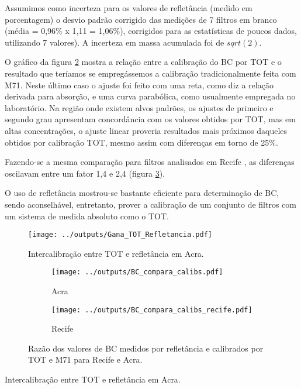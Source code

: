 Assumimos como incerteza para os valores de refletância (medido em porcentagem)
o desvio padrão corrigido das medições de 7 filtros em branco 
(média = 0,96\% x 1,11 = 1,06\%), corrigidos para as estatísticas de poucos 
dados, utilizando 7 valores). A incerteza em massa acumulada foi de $sqrt(2)$.

O gráfico da figura \ref{fig:razaoTOTM71} mostra a relação entre a calibração do 
BC por TOT e o resultado que teríamos se empregássemos a calibração 
tradicionalmente feita com M71. Neste último caso o ajuste foi feito com uma
reta, como diz a relação derivada para absorção, e uma curva parabólica, 
como usualmente empregada no laboratório. Na região onde existem alvos padrões, 
os ajustes de primeiro e segundo grau apresentam concordância com os valores 
obtidos por TOT, mas em altas concentrações, o ajuste linear proveria resultados
mais próximos daqueles obtidos por calibração TOT, mesmo assim com diferenças 
em torno de 25\%. 

Fazendo-se a mesma comparação para filtros analisados em Recife \citep{santos2014},
as diferenças oscilavam entre um fator 1,4 e 2,4 (figura \ref{fig:BC_compara_recife}).

O uso de refletância mostrou-se bastante eficiente para determinação de BC, 
sendo aconselhável, entretanto, prover a calibração de um conjunto de filtros 
com um sistema de medida absoluto como o TOT.


\begin{figure}[H]
	\begin{center}
		\texttt{[image: ../outputs/Gana\_TOT\_Refletancia.pdf]}
		\caption{Intercalibração entre TOT e refletância em Acra. \label{fig:interGanaBC}}
	\end{center}
\end{figure}

\begin{figure}[H]
	\centering
	\begin{subfigure}[b]{0.43\linewidth}
		\texttt{[image: ../outputs/BC\_compara\_calibs.pdf]}
		\caption{Acra \label{fig:razaoTOTM71}}
	\end{subfigure}
		\hspace{0.3cm}
	\begin{subfigure}[b]{0.43\linewidth}
		\texttt{[image: ../outputs/BC\_compara\_calibs\_recife.pdf]}
		\caption{Recife \label{fig:BC_compara_recife}}
	\end{subfigure}%

	\caption{Razão dos valores de BC medidos por refletância e calibrados por 
		TOT e M71 para Recife e Acra. \label{fig:BC_compara}}
\end{figure}

\begin{table}[H]
	\centering
	\small
	
	\caption{Intercalibração entre TOT e refletância em Acra. \label{table:interGanaBC}} 
\end{table} 


